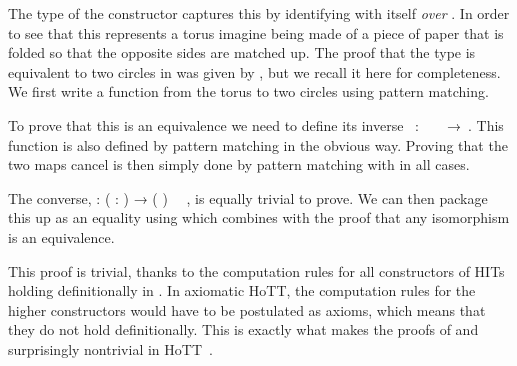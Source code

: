 The type of the  constructor captures this by identifying
 with itself \emph{over} .  In order to see that
this represents a torus imagine  being made of a piece of
paper that is folded so that the opposite sides are matched up.  The
proof that the  type is equivalent to two circles in
\CubicalAgda was given by ,
but we recall it here for completeness. We first write a function from
the torus to two circles using pattern matching.
%

To prove that this is an equivalence we need to define its inverse
~:~~~~→~. This
function is also defined by pattern matching in the obvious
way. Proving that the two maps cancel is then simply done by
pattern matching with  in all cases.
%

The converse,  : ( :  
) →  ( ) \ \  , is
equally trivial to prove. We can then package this up as an equality
using  which combines  with the proof that
any isomorphism is an equivalence.
%

This proof is trivial, thanks to the computation rules
for all constructors of HITs holding definitionally in \CubicalAgda. 
In axiomatic HoTT, the computation rules for the higher constructors
would have to be postulated as axioms, which means that they do not hold
definitionally. This is exactly what makes the proofs of
 and  surprisingly nontrivial in 
HoTT~.

